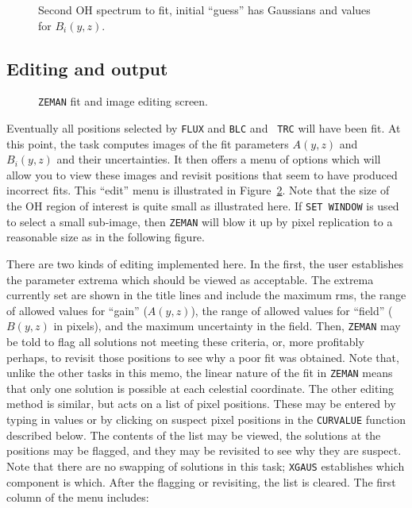 \documentclass[twoside]{article}
\newcommand{\Hi}[1]{\textcolor{hicol}{#1}}
\newcommand{\putfig}[1]{\texttt{[image: \#1.eps]}}
\begin{document}
\begin{figure}
\begin{center}
\resizebox{5.5in}{!}{\putfig{ZEMAN.init2}}
\caption{Second OH spectrum to fit, initial ``guess'' has Gaussians and
   values for $B_i(y,z)$.}
\label{fig:ZEMAN.init2}
\end{center}
\end{figure}

\vfill\eject
\subsection{Editing and output}

\begin{figure}
\begin{center}
\resizebox{6.0in}{!}{\putfig{ZEMAN.edit}}
\caption{{\tt ZEMAN} fit and image editing screen.}
\label{fig:ZEMAN.edit}
\end{center}
\end{figure}

Eventually all positions selected by {\tt FLUX} and {\tt BLC} and {\tt
  TRC} will have been fit.  At this point, the task computes images of
the fit parameters $A(y,z)$ and $B_i(y,z)$ and their uncertainties.
It then offers a menu of options which will allow you to view these
images and revisit positions that seem to have produced incorrect
fits.  This ``edit'' menu is illustrated in
Figure~\ref{fig:ZEMAN.edit}.  Note that the size of the OH \Hi{region
of interest} is quite small \Hi{as illustrated here.  If {\tt SET
  WINDOW} is used to select a small sub-image, then} {\tt ZEMAN} will
blow it up by pixel replication to a reasonable size \Hi{as in the
  following figure}.

There are two kinds of editing implemented here.  In the first, the
user establishes the parameter extrema which should be viewed as
acceptable.  The extrema currently set are shown in the title lines
and include the maximum rms, the range of allowed values for ``gain''
($A(y,z)$), the range of allowed values for ``field'' ($B(y,z)$ in
pixels), and the maximum uncertainty in the field.  Then, {\tt ZEMAN}
may be told to flag all solutions not meeting these criteria, or, more
profitably perhaps, to revisit those positions to see why a poor fit
was obtained.  Note that, unlike the other tasks in this memo, the
linear nature of the fit in {\tt ZEMAN} means that only one solution
is possible at each celestial coordinate.  The other editing method is
similar, but acts on a list of pixel positions.  These may be entered
by typing in values or by clicking on suspect pixel positions in the
{\tt CURVALUE} function described below.  The contents of the list may
be viewed, the solutions at the positions may be flagged, and they may
be revisited to see why they are suspect.  Note that there are no
swapping of solutions in this task; {\tt XGAUS} establishes which
component is which.  After the flagging or revisiting, the list is
cleared.  The first column of the menu includes:
\vfill\eject
\end{document}
